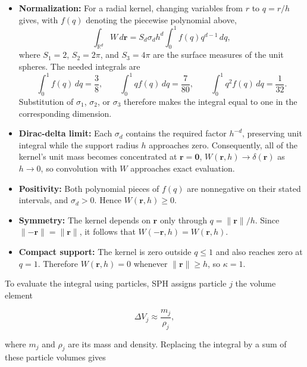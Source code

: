 \documentclass[11pt]{article}
\begin{document}
\begin{itemize}
    \item \textbf{Normalization:} For a radial kernel, changing variables from
    $r$ to $q=r/h$ gives, with $f(q)$ denoting the piecewise polynomial above,
    \begin{equation}
        \int_{\mathbb{R}^d} W\,d\mathbf{r}
        = S_d\sigma_d h^d \int_0^1 f(q)q^{d-1}\,dq,
    \end{equation}
    where $S_1=2$, $S_2=2\pi$, and $S_3=4\pi$ are the surface measures of the
    unit spheres. The needed integrals are
    \begin{equation}
        \int_0^1 f(q)\,dq=\frac{3}{8},
        \qquad
        \int_0^1 qf(q)\,dq=\frac{7}{80},
        \qquad
        \int_0^1 q^2f(q)\,dq=\frac{1}{32}.
    \end{equation}
    Substitution of $\sigma_1$, $\sigma_2$, or $\sigma_3$ therefore makes the
    integral equal to one in the corresponding dimension.
    \item \textbf{Dirac-delta limit:} Each $\sigma_d$ contains the required
    factor $h^{-d}$, preserving unit integral while the support radius $h$
    approaches zero. Consequently, all
    of the kernel's unit mass becomes concentrated at $\mathbf{r}=\mathbf{0}$,
    $W(\mathbf{r},h) \rightarrow \delta(\mathbf{r})$ as $h \rightarrow 0$, so
    convolution with $W$ approaches exact evaluation.
    \item \textbf{Positivity:} Both polynomial pieces of $f(q)$ are
    nonnegative on their stated intervals, and $\sigma_d>0$. Hence
    $W(\mathbf{r},h)\geq 0$.
    \item \textbf{Symmetry:} The kernel depends on $\mathbf{r}$ only through
    $q=\lVert\mathbf{r}\rVert/h$. Since
    $\lVert-\mathbf{r}\rVert=\lVert\mathbf{r}\rVert$, it follows that
    $W(-\mathbf{r},h)=W(\mathbf{r},h)$.
    \item \textbf{Compact support:} The kernel is zero outside $q\leq1$ and
    also reaches zero at $q=1$. Therefore $W(\mathbf{r},h)=0$ whenever
    $\lVert\mathbf{r}\rVert\geq h$, so $\kappa=1$.
\end{itemize}

To evaluate the integral using particles, SPH assigns particle $j$ the volume
element

\begin{equation}
    \Delta V_j \approx \frac{m_j}{\rho_j},
\end{equation}

where $m_j$ and $\rho_j$ are its mass and density. Replacing the integral by a
sum of these particle volumes gives
\end{document}
